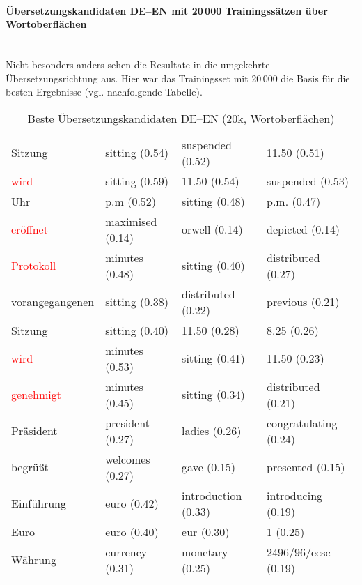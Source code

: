 \documentclass[11pt,twoside,openright]{mpreport}
\begin{document}
\paragraph{Übersetzungskandidaten DE--EN mit 20\,000 Trainingssätzen über Wortoberflächen\\\\}
Nicht besonders anders sehen die Resultate in die umgekehrte Übersetzungsrichtung aus. Hier war das Trainingsset mit 20\,000 die Basis für die besten Ergebnisse (vgl. nachfolgende Tabelle).
\label{sec:evalDeEn10kSurf}
\hspace{-4cm}
\begin{table}[H]
\caption{Beste Übersetzungskandidaten DE--EN (20k, Wortoberflächen)}
\begin{scriptsize}
\begin{tabular}{|llll|}
\hline
Sitzung                 & sitting (0.54) & suspended (0.52) & 11.50 (0.51) \\ %
\textcolor{red}{wird}                    & sitting (0.59) & 11.50 (0.54) & suspended (0.53) \\
Uhr                     & p.m (0.52) & sitting (0.48) & p.m. (0.47) \\ %
\textcolor{red}{eröffnet}               & maximised (0.14) & orwell (0.14) & depicted (0.14) \\
\textcolor{red}{Protokoll}               & minutes (0.48) & sitting (0.40) & distributed (0.27) \\
vorangegangenen         & sitting (0.38) & distributed (0.22) & previous (0.21) \\ %
Sitzung                 & sitting (0.40) & 11.50 (0.28) & 8.25 (0.26) \\ %
\textcolor{red}{wird}                    & minutes (0.53) & sitting (0.41) & 11.50 (0.23) \\
\textcolor{red}{genehmigt}               & minutes (0.45) & sitting (0.34) & distributed (0.21) \\
Präsident              & president (0.27) & ladies (0.26) & congratulating (0.24) \\ %
begrüßt               & welcomes (0.27) & gave (0.15) & presented (0.15) \\ %
Einführung             & euro (0.42) & introduction (0.33) & introducing (0.19) \\ %
Euro                    & euro (0.40) & eur (0.30) & 1 (0.25) \\ %
Währung                & currency (0.31) & monetary (0.25) & 2496/96/ecsc (0.19) \\ %

\end{tabular}
\end{scriptsize}
\end{table}
\end{document}
